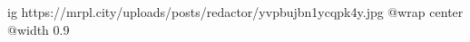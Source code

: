  
 
 
 
 

\ifcmt
  ig https://mrpl.city/uploads/posts/redactor/yvpbujbn1ycqpk4y.jpg
  @wrap center
  @width 0.9
\fi
